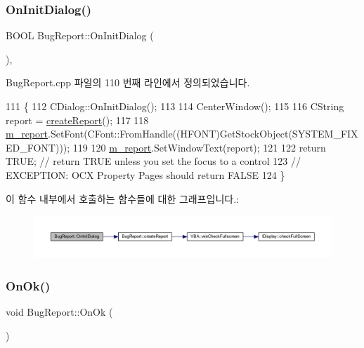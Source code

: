 \subsubsection{\texorpdfstring{On\+Init\+Dialog()}{OnInitDialog()}}
{\footnotesize\ttfamily B\+O\+OL Bug\+Report\+::\+On\+Init\+Dialog (\begin{DoxyParamCaption}{ }\end{DoxyParamCaption})\hspace{0.3cm}{\ttfamily [protected]}, {\ttfamily [virtual]}}



Bug\+Report.\+cpp 파일의 110 번째 라인에서 정의되었습니다.


\begin{DoxyCode}
111 \{
112   CDialog::OnInitDialog();
113     
114   CenterWindow();
115 
116   CString report = \mbox{\hyperlink{class_bug_report_afe00e8dd3efa190199d8d645cb702e07}{createReport}}();
117 
118   \mbox{\hyperlink{class_bug_report_aef6dd887fcfe40d98d0fa1c6cf2d2466}{m\_report}}.SetFont(CFont::FromHandle((HFONT)GetStockObject(SYSTEM\_FIXED\_FONT)));
119 
120   \mbox{\hyperlink{class_bug_report_aef6dd887fcfe40d98d0fa1c6cf2d2466}{m\_report}}.SetWindowText(report);
121     
122   \textcolor{keywordflow}{return} TRUE;  \textcolor{comment}{// return TRUE unless you set the focus to a control}
123   \textcolor{comment}{// EXCEPTION: OCX Property Pages should return FALSE}
124 \}
\end{DoxyCode}
이 함수 내부에서 호출하는 함수들에 대한 그래프입니다.\+:
\nopagebreak
\begin{figure}[H]
\begin{center}
\leavevmode
\includegraphics[width=350pt]{class_bug_report_abcfc2e192747272d1708a1d479bfd45b_cgraph}
\end{center}
\end{figure}
\mbox{\label{class_bug_report_a2c9a7f1da33a46ca97f0ecd821e701e9}} 
\subsubsection{\texorpdfstring{On\+Ok()}{OnOk()}}
{\footnotesize\ttfamily void Bug\+Report\+::\+On\+Ok (\begin{DoxyParamCaption}{ }\end{DoxyParamCaption})\hspace{0.3cm}{\ttfamily [protected]}}



